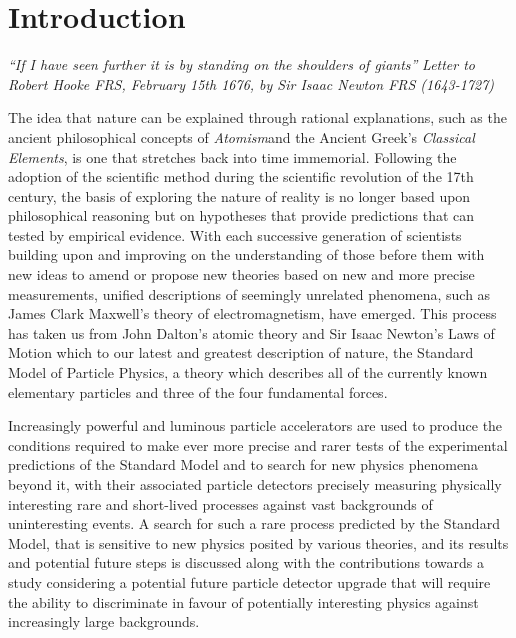 \chapter*{Introduction}\label{chapter:intro}

\emph{``If I have seen further it is by standing on the shoulders of giants''}
\emph{Letter to Robert Hooke FRS, February 15th 1676, by Sir Isaac Newton FRS (1643-1727)}

The idea that nature can be explained through rational explanations, such as the ancient philosophical concepts of \emph{Atomism}and the Ancient Greek's \emph{Classical Elements}, is one that stretches back into time immemorial.
Following the adoption of the scientific method during the scientific revolution of the 17th century, the basis of  exploring the nature of reality is no longer based upon philosophical reasoning but on hypotheses that provide predictions that can tested by empirical evidence.
With each successive generation of scientists building upon and improving on the understanding of those before them with new ideas to amend or propose new theories based on new and more precise measurements, unified descriptions of seemingly unrelated phenomena, such as James Clark Maxwell's theory of electromagnetism, have emerged.
This process has taken us from John Dalton's atomic theory and Sir Isaac Newton's Laws of Motion which to our latest and greatest description of nature, the Standard Model of Particle Physics, a theory which describes all of the currently known elementary particles and three of the four fundamental forces.

Increasingly powerful and luminous particle accelerators are used to produce the conditions required to make ever more precise and rarer tests of the experimental predictions of the Standard Model and to search for new physics phenomena beyond it, with their associated particle detectors precisely measuring physically interesting rare and short-lived processes against vast backgrounds of uninteresting events.
A search for such a rare process predicted by the Standard Model, that is sensitive to new physics posited by various theories, and its results and potential future steps is discussed along with the contributions towards a study considering a potential future particle detector upgrade that will require the ability to discriminate in favour of potentially interesting physics against increasingly large backgrounds.